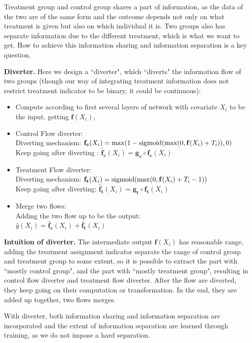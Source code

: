 \documentclass[11pt,paper=letter]{scrartcl}
\begin{document}
Treatment group and control group shares a part of information, as the data of the two are of the same form and the outcome depends not only on what treatment is given but also on which individual it is. Two groups also has separate information due to the different treatment, which is what we want to get. How to achieve this information sharing and information separation is a key question.
 
\textbf{Diverter.} Here we design a ``diverter", which ``diverts" the information flow of two groups (though our way of integrating treatment information does not restrict treatment indicator to be binary, it could be continuous):

\begin{itemize}
\item Compute according to first several layers of network with covariate $X_i$ to be the input, getting $\mathbf{f}(X_i)$,
\item Control Flow diverter:\\
	    Diverting mechanism: $\mathbf{f_c}(X_i)  = \max(1- \textnormal{sigmoid}( \max(0, \mathbf{f}(X_i)+T_i) ), 0)   $ \\
		Keep going after diverting : $\mathbf{\tilde{f_c}}(X_i) = \mathbf{g_c} \circ \mathbf{f_c}(X_i) $ 
\item Treatment Flow diverter:\\
		Diverting mechanism: $\mathbf{f_t}(X_i) = \textnormal{sigmoid}( \max( 0, \mathbf{f}(X_i)+T_i-1))  $ \\
		Keep going after diverting: $\mathbf{\tilde{f_t}}(X_i) = \mathbf{g_t} \circ \mathbf{f_t}(X_i)   $
\item Merge two flows:\\
		Adding the two flow up to be the output:\\
		$\hat{y}(X_i) = \mathbf{\tilde{f_c}}(X_i) + \mathbf{\tilde{f_t}}(X_i) $
\end{itemize}

\textbf{Intuition of diverter.} The intermediate output $\mathbf{f}(X_i)$ has reasonable range, adding the treatment assignment indicator separate the range of control group and treatment group to some extent, so it is possible to extract the part with ``mostly control group", and the part with ``mostly treatment group", resulting in control flow diverter and treatment flow diverter. After the flow are diverted, they keep going on their computation or transformation. In the end, they are added up together, two flows merges.

With diverter, both information sharing and information separation are incorporated and the extent of information separation are learned through training, as we do not impose a hard separation.
\end{document}
